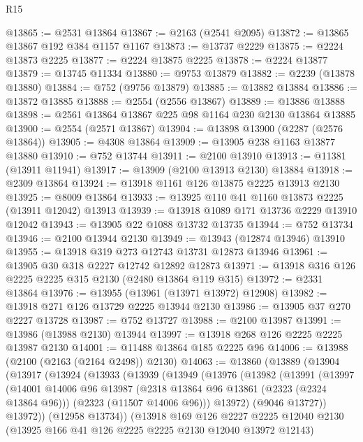 \begin{lexlean}{R15}
\begin{coremodule}
@13865 := @2531 @13864
@13867 := @2163 (@2541 @2095)
@13872 := @13865 @13867 @192 @384 @1157 @1167
@13873 := @13737 @2229
@13875 := @2224 @13873 @2225
@13877 := @2224 @13875 @2225
@13878 := @2224 @13877
@13879 := @13745 @11334
@13880 := @9753 @13879
@13882 := @2239 (@13878 @13880)
@13884 := @752 (@9756 @13879)
@13885 := @13882 @13884
@13886 := @13872 @13885
@13888 := @2554 (@2556 @13867)
@13889 := @13886 @13888
@13898 := @2561 @13864 @13867 @225 @98 @1164 @230 @2130 @13864 @13885
@13900 := @2554 (@2571 @13867)
@13904 := @13898 @13900 (@2287 (@2576 @13864))
@13905 := @4308 @13864
@13909 := @13905 @238 @1163 @13877 @13880
@13910 := @752 @13744
@13911 := @2100 @13910
@13913 := @11381 (@13911 @11941)
@13917 := @13909 (@2100 @13913 @2130) @13884
@13918 := @2309 @13864
@13924 := @13918 @1161 @126 @13875 @2225 @13913 @2130
@13925 := @8009 @13864
@13933 := @13925 @110 @41 @1160 @13873 @2225 (@13911 @12042) @13913
@13939 := @13918 @1089 @171 @13736 @2229 @13910 @12042
@13943 := @13905 @22 @1088 @13732 @13735
@13944 := @752 @13734
@13946 := @2100 @13944 @2130
@13949 := @13943 (@12874 @13946) @13910
@13955 := @13918 @319 @273 @12743 @13731 @12873 @13946
@13961 := @13905 @30 @318 @2227 @12742 @12892 @12873
@13971 := @13918 @316 @126 @2225 @2225 @315 @2130 (@2480 @13864 @119 @315)
@13972 := @2331 @13864
@13976 := @13955 (@13961 (@13971 @13972) @12908)
@13982 := @13918 @271 @126 @13729 @2225 @13944 @2130
@13986 := @13905 @37 @270 @2227 @13728
@13987 := @752 @13727
@13988 := @2100 @13987
@13991 := @13986 (@13988 @2130) @13944
@13997 := @13918 @268 @126 @2225 @2225 @13987 @2130
@14001 := @11488 @13864 @185 @2225 @96
@14006 := @13988 (@2100 (@2163 (@2164 @2498)) @2130)
@14063 := @13860
    (@13889
      (@13904
        (@13917
          (@13924
            (@13933
              (@13939
                (@13949
                  (@13976
                    (@13982
                      (@13991
                        (@13997
                          (@14001
                            @14006
                            @96
                            @13987
                            (@2318 @13864 @96 @13861 (@2323 (@2324 @13864 @96)))
                            (@2323 (@11507 @14006 @96)))
                          @13972)
                        (@9046 @13727))
                      @13972))
                  (@12958 @13734))
                (@13918
                  @169
                  @126
                  @2227
                  @2225
                  @12040
                  @2130
                  (@13925 @166 @41 @126 @2225 @2225 @2130 @12040 @13972 @12143)

\end{coremodule}
\end{lexlean}
